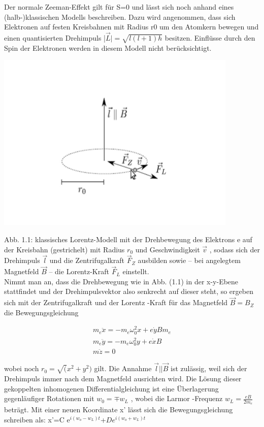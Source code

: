 \documentclass[10pt,a4paper]{article}
\begin{document}
Der normale Zeeman-Effekt gilt für S=0 und lässt sich noch anhand eines (halb-)klassischen Modells beschreiben. Dazu wird angenommen, dass sich Elektronen auf festen Kreisbahnen mit Radius r0  um den Atomkern bewegen und einen quantisierten Drehimpuls |$\overrightarrow{L}|=\sqrt{l(l+1)h}$ besitzen.  Einflüsse durch den Spin der Elektronen werden in diesem Modell nicht berücksichtigt.

\includegraphics{lotenzmodell}

Abb. 1.1: klassisches Lorentz-Modell mit der Drehbewegung des Elektrons e auf der Kreisbahn (gestrichelt) mit Radius $r_{0}$ und Geschwindigkeit $\overrightarrow{v}$ , sodass sich der Drehimpuls $\overrightarrow{l}$ und die Zentrifugalkraft $\overrightarrow{F}_{Z}$ ausbilden sowie – bei angelegtem Magnetfeld ⃗$\overrightarrow{B}$ – die Lorentz-Kraft ⃗$\overrightarrow{F}_{L}$ einstellt.\\


Nimmt man an, dass die Drehbewegung wie in Abb. (1.1) in der x-y-Ebene stattfindet und der Drehimpulsvektor also senkrecht auf dieser steht, so ergeben sich mit der Zentrifugalkraft
und der Lorentz -Kraft für das Magnetfeld $\overrightarrow{B}=B_{Z}$ die Bewegungsgleichung


\begin{align}
m_{e}\ddot x=−m_{e}\omega_{0}^2 x+e\dot{y}B m_{e}\\
m_{e}\ddot y=−m_{e}\omega_{0}^2 y+e\dot{x}B\\
m\ddot z=0 
\end{align}


 wobei noch $r_{0}=\sqrt (x^2+y^2)$ gilt. Die Annahme $\overrightarrow{l}|| \overrightarrow{B}$  ist zulässig, weil sich der Drehimpuls immer nach dem Magnetfeld ausrichten wird. Die Lösung dieser gekoppelten inhomogenen Differentialgleichung ist eine Überlagerung gegenläufiger Rotationen mit $w_{0}= \mp w_{L}$ , wobei die Larmor -Frequenz $w_{L} = \frac{eB}{2m_{e}}$ beträgt. Mit einer neuen Koordinate x' lässt sich die Bewegungsgleichung schreiben als: x'=C e$^{i(w_{o}-w_{L})t}$+$D e^{i(w_{o}+w_{L})t}$
\\
\end{document}
